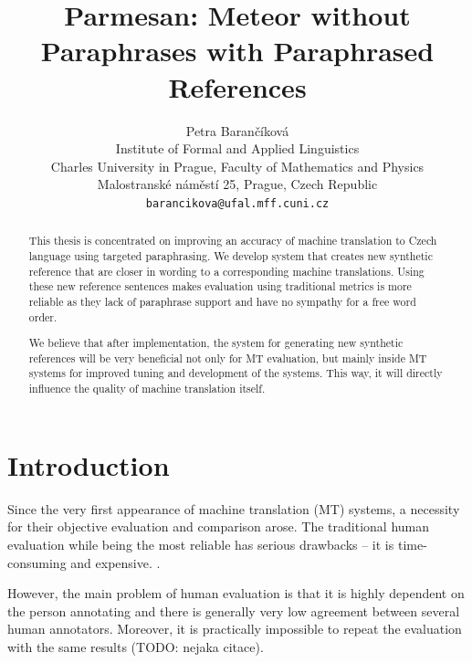 \documentclass[11pt]{article}
\title{Parmesan: Meteor without Paraphrases with Paraphrased References}
\author{Petra Barančíková \\
  Institute of Formal and Applied Linguistics \\
  Charles University in Prague, Faculty of Mathematics and Physics\\
  Malostranské náměstí 25, Prague, Czech Republic \\
  {\tt barancikova@ufal.mff.cuni.cz} \\}
\date{}
\begin{document}
\maketitle
\begin{abstract}
This thesis is concentrated on improving an accuracy of machine translation
to Czech language using targeted paraphrasing. We develop system that creates
new synthetic reference that are closer in wording to a corresponding machine
translations. Using these new reference sentences makes evaluation using traditional
metrics is more reliable as they lack of paraphrase support and have no sympathy
for a free word order.

We believe that after implementation, the system for generating new synthetic
references will be very beneficial not only for MT evaluation, but mainly
inside MT systems for improved tuning and development of the systems. This way,
it will directly influence the quality of machine translation itself.

\end{abstract}

\section{Introduction}
Since the very first appearance of machine translation (MT) systems, a necessity
for their objective evaluation and comparison arose. The traditional human evaluation 
while being the most reliable has serious drawbacks -- it is time-consuming and expensive.
.%

However, the main problem of human evaluation is that it is highly dependent on the 
person annotating and there is generally very low agreement between several human
annotators. %
Moreover, it is practically impossible to repeat the evaluation with the same
results (TODO: nejaka citace).
\end{document}
